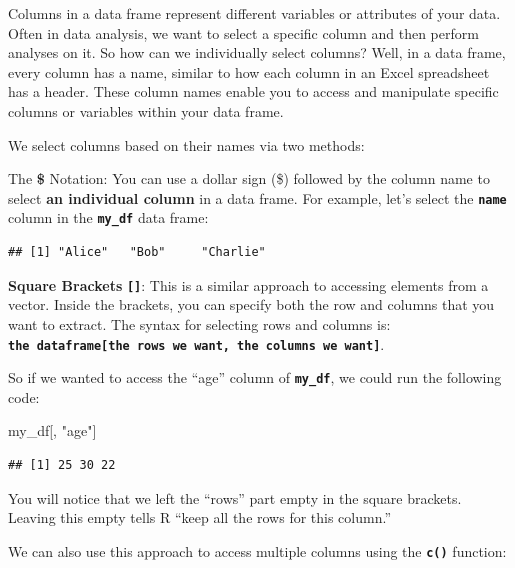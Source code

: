 \documentclass[
]{book}
\newenvironment{Shaded}{\begin{snugshade}}{\end{snugshade}}
\newcommand{\NormalTok}[1]{#1}
\newcommand{\SpecialCharTok}[1]{\textcolor[rgb]{0.81,0.36,0.00}{\textbf{#1}}}
\newcommand{\StringTok}[1]{\textcolor[rgb]{0.31,0.60,0.02}{#1}}
\begin{document}
Columns in a data frame represent different variables or attributes of your data. Often in data analysis, we want to select a specific column and then perform analyses on it. So how can we individually select columns? Well, in a data frame, every column has a name, similar to how each column in an Excel spreadsheet has a header. These column names enable you to access and manipulate specific columns or variables within your data frame.

We select columns based on their names via two methods:

The \textbf{\$} Notation: You can use a dollar sign (\$) followed by the column name to select \textbf{an individual column} in a data frame. For example, let's select the \textbf{\texttt{name}} column in the \textbf{\texttt{my\_df}} data frame:

\begin{Shaded}
\end{Shaded}

\begin{verbatim}
## [1] "Alice"   "Bob"     "Charlie"
\end{verbatim}

\textbf{Square Brackets} \textbf{\texttt{{[}{]}}}: This is a similar approach to accessing elements from a vector. Inside the brackets, you can specify both the row and columns that you want to extract. The syntax for selecting rows and columns is: \textbf{\texttt{the\ dataframe{[}the\ rows\ we\ want,\ the\ columns\ we\ want{]}}}.

So if we wanted to access the ``age'' column of \textbf{\texttt{my\_df}}, we could run the following code:

\begin{Shaded}
\begin{Highlighting}[]
\NormalTok{my\_df[, }\StringTok{"age"}\NormalTok{]}
\end{Highlighting}
\end{Shaded}

\begin{verbatim}
## [1] 25 30 22
\end{verbatim}

You will notice that we left the ``rows'' part empty in the square brackets. Leaving this empty tells R ``keep all the rows for this column.''

We can also use this approach to access multiple columns using the \textbf{\texttt{c()}} function:
\end{document}

